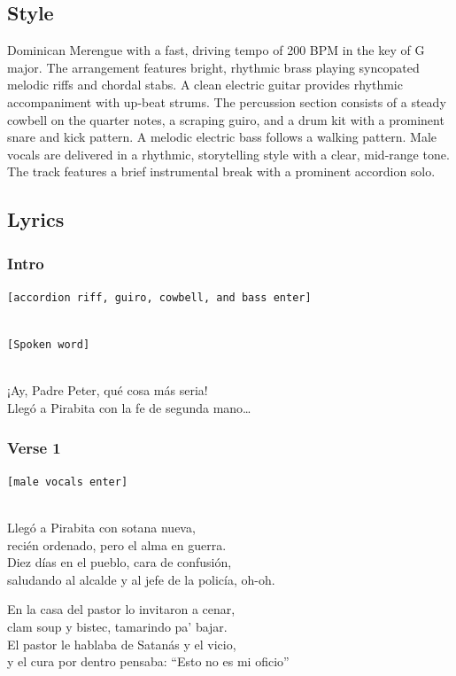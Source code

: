\subsection{Style}\label{style-21}

Dominican Merengue with a fast, driving tempo of 200 BPM in the key of G
major. The arrangement features bright, rhythmic brass playing
syncopated melodic riffs and chordal stabs. A clean electric guitar
provides rhythmic accompaniment with up-beat strums. The percussion
section consists of a steady cowbell on the quarter notes, a scraping
guiro, and a drum kit with a prominent snare and kick pattern. A melodic
electric bass follows a walking pattern. Male vocals are delivered in a
rhythmic, storytelling style with a clear, mid-range tone. The track
features a brief instrumental break with a prominent accordion solo.

\subsection{Lyrics}\label{lyrics-21}

\subsubsection{Intro}\label{intro-3}

\texttt{{[}accordion\ riff,\ guiro,\ cowbell,\ and\ bass\ enter{]}}\strut \\
\texttt{{[}Spoken\ word{]}}\strut \\
¡Ay, Padre Peter, qué cosa más seria!\\
Llegó a Pirabita con la fe de segunda mano\ldots{}

\subsubsection{Verse 1}\label{verse-1-13}

\texttt{{[}male\ vocals\ enter{]}}\strut \\
Llegó a Pirabita con sotana nueva,\\
recién ordenado, pero el alma en guerra.\\
Diez días en el pueblo, cara de confusión,\\
saludando al alcalde y al jefe de la policía, oh-oh.

En la casa del pastor lo invitaron a cenar,\\
clam soup y bistec, tamarindo pa' bajar.\\
El pastor le hablaba de Satanás y el vicio,\\
y el cura por dentro pensaba: ``Esto no es mi oficio''

